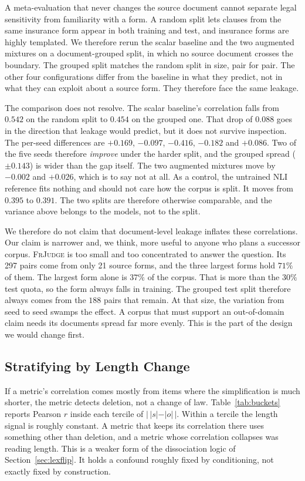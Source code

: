 \documentclass{BVP_JCLLT}
\newcommand{\rev}[1]{#1}
\newcommand{\rev}[1]{{\color{revcol}#1}}
\begin{document}
\rev{A meta-evaluation that never changes the source document cannot separate
legal sensitivity from familiarity with a form. A random split lets clauses from
the same insurance form appear in both training and test, and insurance forms
are highly templated. We therefore rerun the scalar baseline and the two
augmented mixtures on a document-grouped split, in which no source document
crosses the boundary. The grouped split matches the random split in size, pair
for pair. The other four configurations differ from the baseline in what they
predict, not in what they can exploit about a source form. They therefore face
the same leakage.

The comparison does not resolve. The scalar baseline's correlation falls from
$0.542$ on the random split to $0.454$ on the grouped one. That drop of $0.088$
goes in the direction that leakage would predict, but it does not survive
inspection. The per-seed differences are $+0.169$, $-0.097$, $-0.416$, $-0.182$
and $+0.086$. Two of the five seeds therefore \emph{improve} under the harder
split, and the grouped spread ($\pm0.143$) is wider than the gap itself. The two
augmented mixtures move by $-0.002$ and $+0.026$, which is to say not at all.
As a control, the untrained NLI reference fits nothing and should not care how
the corpus is split. It moves from $0.395$ to $0.391$. The two splits are
therefore otherwise comparable, and the variance above belongs to the models,
not to the split.

We therefore do not claim that document-level leakage inflates these
correlations. Our claim is narrower and, we think, more useful to anyone who
plans a successor corpus. \textsc{FrJudge} is too small and too concentrated to
answer the question. Its 297 pairs come from only 21 source forms, and the three
largest forms hold $71\%$ of them. The largest form alone is $37\%$ of the
corpus. That is more than the $30\%$ test quota, so the form always falls in
training. The grouped test split therefore always comes from the $188$ pairs
that remain. At that size, the variation from seed to seed swamps the effect. A
corpus that must support an out-of-domain claim needs its documents spread far
more evenly. This is the part of the design we would change first.}

\subsection{Stratifying by Length Change}\label{sec:buckets}

\rev{If a metric's correlation comes mostly from items where the simplification
is much shorter, the metric detects deletion, not a change of law.
Table~\ref{tab:buckets} reports Pearson $r$ inside each tercile of
$|\,|s|-|o|\,|$. Within a tercile the length signal is roughly constant. A metric
that keeps its correlation there uses something other than deletion, and a
metric whose correlation collapses was reading length. This is a weaker form of
the dissociation logic of Section~\ref{sec:lexflip}. It holds a confound roughly
fixed by conditioning, not exactly fixed by construction.}
\end{document}
